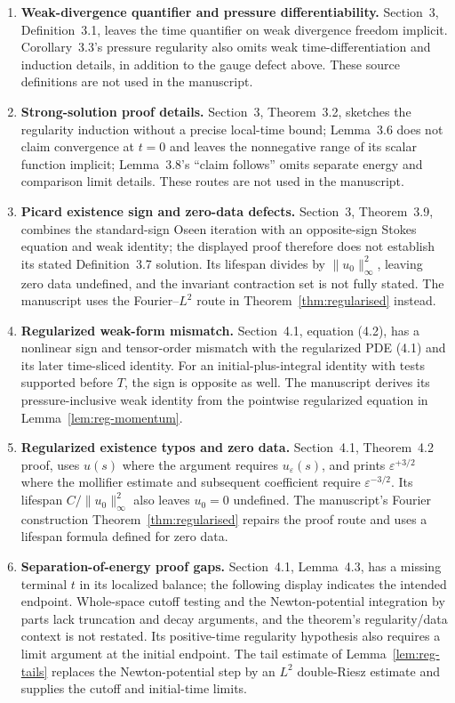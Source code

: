 \documentclass[11pt,reqno]{amsart}
\begin{document}
\begin{enumerate}
\item \textbf{Weak-divergence quantifier and pressure differentiability.} Section~3, Definition~3.1, leaves the time quantifier on weak divergence freedom implicit. Corollary~3.3's pressure regularity also omits weak time-differentiation and induction details, in addition to the gauge defect above. These source definitions are not used in the manuscript.

\item \textbf{Strong-solution proof details.} Section~3, Theorem~3.2, sketches the regularity induction without a precise local-time bound; Lemma~3.6 does not claim convergence at \(t=0\) and leaves the nonnegative range of its scalar function implicit; Lemma~3.8's “claim follows” omits separate energy and comparison limit details. These routes are not used in the manuscript.

\item \textbf{Picard existence sign and zero-data defects.} Section~3, Theorem~3.9, combines the standard-sign Oseen iteration with an opposite-sign Stokes equation and weak identity; the displayed proof therefore does not establish its stated Definition~3.7 solution. Its lifespan divides by \(\|u_0\|_\infty^2\), leaving zero data undefined, and the invariant contraction set is not fully stated. The manuscript uses the Fourier--\(L^2\) route in Theorem~\ref{thm:regularised} instead.

\item \textbf{Regularized weak-form mismatch.} Section~4.1, equation (4.2), has a nonlinear sign and tensor-order mismatch with the regularized PDE (4.1) and its later time-sliced identity. For an initial-plus-integral identity with tests supported before \(T\), the sign is opposite as well. The manuscript derives its pressure-inclusive weak identity from the pointwise regularized equation in Lemma~\ref{lem:reg-momentum}.

\item \textbf{Regularized existence typos and zero data.} Section~4.1, Theorem~4.2 proof, uses \(u(s)\) where the argument requires \(u_\varepsilon(s)\), and prints \(\varepsilon^{+3/2}\) where the mollifier estimate and subsequent coefficient require \(\varepsilon^{-3/2}\). Its lifespan \(C/\|u_0\|_\infty^2\) also leaves \(u_0=0\) undefined. The manuscript's Fourier construction Theorem~\ref{thm:regularised} repairs the proof route and uses a lifespan formula defined for zero data.

\item \textbf{Separation-of-energy proof gaps.} Section~4.1, Lemma~4.3, has a missing terminal \(t\) in its localized balance; the following display indicates the intended endpoint. Whole-space cutoff testing and the Newton-potential integration by parts lack truncation and decay arguments, and the theorem's regularity/data context is not restated. Its positive-time regularity hypothesis also requires a limit argument at the initial endpoint. The tail estimate of Lemma~\ref{lem:reg-tails} replaces the Newton-potential step by an \(L^2\) double-Riesz estimate and supplies the cutoff and initial-time limits.


\end{enumerate}
\end{document}
